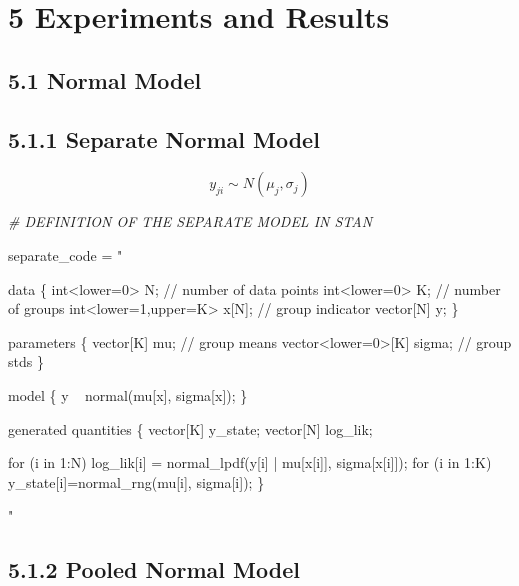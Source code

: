 \documentclass[]{article}
\newenvironment{Shaded}{\begin{snugshade}}{\end{snugshade}}
\newcommand{\StringTok}[1]{\textcolor[rgb]{0.31,0.60,0.02}{#1}}
\newcommand{\CommentTok}[1]{\textcolor[rgb]{0.56,0.35,0.01}{\textit{#1}}}
\newcommand{\NormalTok}[1]{#1}
\begin{document}
\section{5 Experiments and Results}\label{experiments-and-results}

\subsection{5.1 Normal Model}\label{normal-model}

\subsection{5.1.1 Separate Normal Model}\label{separate-normal-model}

\[ y_{ji} \sim N(\mu_j,\sigma_j)\]

\begin{Shaded}
\begin{Highlighting}[]
\CommentTok{# DEFINITION OF THE SEPARATE MODEL IN STAN}

\NormalTok{separate_code =}\StringTok{ "}

\StringTok{data \{}
\StringTok{  int<lower=0> N;             // number of data points}
\StringTok{  int<lower=0> K;             // number of groups}
\StringTok{  int<lower=1,upper=K> x[N];  // group indicator}
\StringTok{  vector[N] y;}
\StringTok{\}}

\StringTok{parameters \{}
\StringTok{  vector[K] mu;               // group means}
\StringTok{  vector<lower=0>[K] sigma;   // group stds}
\StringTok{\}}

\StringTok{model \{}
\StringTok{  y ~ normal(mu[x], sigma[x]);}
\StringTok{\}}

\StringTok{generated quantities \{}
\StringTok{  vector[K] y_state;}
\StringTok{  vector[N] log_lik;                                }

\StringTok{  for (i in 1:N)                                           }
\StringTok{    log_lik[i] = normal_lpdf(y[i] | mu[x[i]], sigma[x[i]]);     }
\StringTok{  }
\StringTok{  for (i in 1:K)}
\StringTok{    y_state[i]=normal_rng(mu[i], sigma[i]);}
\StringTok{\}}

\StringTok{"}
\end{Highlighting}
\end{Shaded}

\subsection{5.1.2 Pooled Normal Model}\label{pooled-normal-model}
\end{document}
